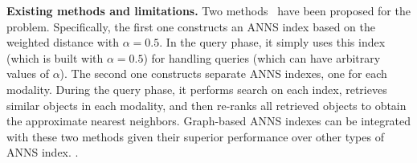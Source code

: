 \noindent\textbf{{%
Existing methods and limitations.}} 
{%
Two methods~\cite{milvus2021} have been proposed for the \hvq problem.} 
{Specifically, {%
the first one} constructs {%
an ANNS index based on the weighted distance with $\alpha = 0.5$.}}
In the query phase, it {%
simply uses this index (which is built with $\alpha = 0.5$) for handling queries (which can have arbitrary values of $\alpha$).}
{%
The second one} constructs separate ANNS indexes, {%
one} for each modality. During the query phase, it performs {\cheng search} on each index, retrieves similar objects in each modality, and then re-ranks {%
all retrieved objects} to obtain the approximate nearest neighbors. 
{%
Graph-based ANNS indexes can be %
integrated with these two methods given their superior performance over other {\cheng types of ANNS index}. %
}.

